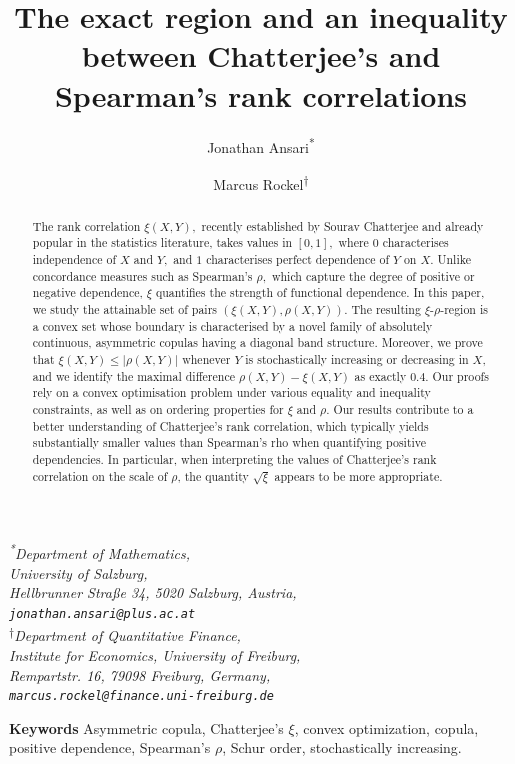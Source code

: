 \documentclass{article}
\title{The exact region and an inequality between Chatterjee's and Spearman's rank correlations
}
\author{%
  Jonathan Ansari\textsuperscript{*}
  \and
  Marcus Rockel\textsuperscript{$\dagger$}
}
\theoremstyle{plain}
\theoremstyle{definition}
\begin{document}
\maketitle
\begin{center}
  \small\textit{%
    \textsuperscript{*}Department of Mathematics,\\
    University of Salzburg,\\
    Hellbrunner Straße 34, 5020 Salzburg, Austria,\\
    \texttt{jonathan.ansari@plus.ac.at}
  }\\[2mm]
  \small\textit{%
    \textsuperscript{$\dagger$}Department of Quantitative Finance,\\
    Institute for Economics, University of Freiburg,\\
    Rempartstr. 16, 79098 Freiburg, Germany,\\
    \texttt{marcus.rockel@finance.uni-freiburg.de}
  }
\end{center}
\begin{abstract}
The rank correlation \(\xi(X,Y),\) recently established by Sourav Chatterjee and already popular in the statistics literature, takes values in \([0,1],\) where \(0\) characterises independence of \(X\) and \(Y,\) and \(1\) characterises perfect dependence of \(Y\) on \(X.\)
Unlike concordance measures such as Spearman’s \(\rho,\) which capture the degree of positive or negative dependence, \(\xi\) quantifies the strength of functional dependence.
In this paper, we study the attainable set of pairs \((\xi(X,Y),\rho(X,Y))\).
The resulting \(\xi\)-\(\rho\)-region is a convex set whose boundary is characterised by a novel family of absolutely continuous, asymmetric copulas having a diagonal band structure.
Moreover, we prove that \(\xi(X,Y)\le |\rho(X,Y)|\) whenever \(Y\) is stochastically increasing or decreasing in \(X,\) and we identify the maximal difference \(\rho(X,Y)-\xi(X,Y)\) as exactly \(0.4.\) Our proofs rely on a convex optimisation problem under various equality and inequality constraints, as well as on ordering properties for \(\xi\) and \(\rho.\)
Our results contribute to a better understanding of Chatterjee’s rank correlation, which typically yields substantially smaller values than Spearman's rho when quantifying positive dependencies. In particular, when interpreting the values of Chatterjee’s rank correlation on the scale of \(\rho\), the quantity \(\sqrt{\xi}\) appears to be more appropriate.
\end{abstract}

\vspace{0ex}
\textbf{Keywords } Asymmetric copula, Chatterjee's $\xi$, convex optimization, copula, positive dependence, Spearman's \(\rho\), Schur order, stochastically increasing.
\end{document}
